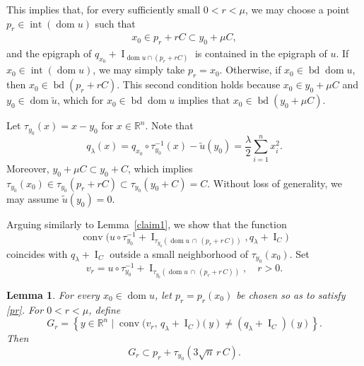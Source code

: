 \documentclass[11pt]{article}
\newtheorem{lema}[teo]{Lemma}
\theoremstyle{definition} %
\DeclareMathOperator{\conv}{conv}
\DeclareMathOperator{\I}{I}
\DeclareMathOperator{\dom}{dom}
\DeclareMathOperator{\interior}{int}
\DeclareMathOperator{\bd}{bd}
\begin{document}
This implies that, for every sufficiently small $0<r<\mu$, we may choose a point
$p_r\in\interior(\dom u)$ such that
\begin{align}\label{pr}
x_0\in p_r+rC\subset y_0+\mu C,
\end{align}
and the epigraph of
\(
q_{x_0}+\I_{\dom u\cap(p_r+rC)}
\)
is contained in the epigraph of $u$. If  $x_0\in\interior(\dom u)$, we may simply take $p_r=x_0$. Otherwise, if $x_0\in \bd \dom u$, then $x_0\in \bd (p_r+rC)$. This second condition holds because $x_0\in y_0+\mu C$ and $y_0\in \dom \tilde{u}$, which for $x_0\in \bd \dom u$ implies that $x_0\in \bd (y_0+\mu C)$.




Let $\tau_{y_0}(x)=x-y_0$ for $x\in\mathbb{R}^n$. Note that 
$$q_\lambda(x)= q_{x_0}\circ\tau_{y_0}^{-1}(x) -\tilde{u}(y_0)= \dfrac{\lambda}{2}\sum_{i=1}^n x_i^2.$$
Moreover, $y_0+\mu C\subset y_0+ C$, which implies  $\tau_{y_0}(x_0)\in \tau_{y_0}(p_r+rC)\subset\tau_{y_0}(y_0+C)=C$. Without loss of generality, we may assume $\tilde{u}(y_0)=0$. 


Arguing similarly to Lemma~\ref{claim1}, we show that the function
$$\conv\bigl(u\circ \tau_{y_0}^{-1}+\I_{\tau_{y_0}(\dom u\,\cap \, (p_r+r\, C))}, q_\lambda+\I_{C}\bigr)$$
coincides with $q_\lambda+\I_{C}$ outside a small neighborhood of $\tau_{y_0}(x_0)$.  Set 
$$v_r= u\circ \tau_{y_0}^{-1}+\I_{\tau_{y_0}(\dom u\,\cap \, (p_r+r\, C))}, \quad r>0.$$

\begin{lema}\label{claim4}
For every $x_0\in\dom u$, let $p_r=p_r(x_0)$ be chosen so as to satisfy \eqref{pr}. For $0<r<\mu$, define
$$
G_r = \left\{y\in\mathbb{R}^n\mid  \conv\bigl(v_r,\, q_\lambda+\I_{C}\bigr)(y) \neq (q_\lambda+\I_{C})(y) \right\}.
$$
Then 
$$
G_r \subset  p_r+\tau_{y_0}(3\sqrt{n} \, r\, C).
$$
\end{lema}
\end{document}
